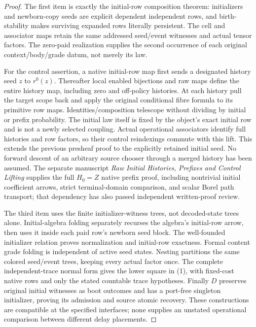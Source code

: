 \documentclass[11pt]{article}
\begin{document}
\begin{proof}
The first item is exactly the initial-row composition theorem: initializers
and newborn-copy seeds are explicit dependent independent rows, and
birth-stability makes surviving expanded rows literally persistent.
The cell and associator maps retain the same addressed seed/event witnesses
and actual tensor factors. The zero-paid realization supplies the second
occurrence of each original context/body/grade datum, not merely its law.

For the control assertion, a native initial-row map first sends a designated
history seed $z$ to $r^0(z)$. Thereafter local enabled bijections and raw maps
define the entire history map, including zero and off-policy histories.
At each history pull the target scope back and apply the original conditional
fibre formula to its primitive row maps. Identities/composition telescope
without dividing by initial or prefix probability. The initial law itself
is fixed by the object's exact initial row and is not a newly selected
coupling. Actual operational associators identify full histories and row
factors, so their control reindexings commute with this lift. This extends
the previous presheaf proof to the explicitly retained initial seed.
No forward descent of an arbitrary source chooser through a merged history
has been assumed. The separate manuscript \emph{Raw Initial Histories, Prefixes and Control Lifting} supplies the full $H_0=Z$ native prefix proof, including nontrivial initial coefficient arrows, strict terminal-domain comparison, and scalar Borel path transport; that dependency has also passed independent written-proof review.

The third item uses the finite initializer-witness trees, not decoded-state
trees alone. Initial-algebra folding separately recurses the algebra's
initial-row arrow, then uses it inside each paid row's newborn seed block.
The well-founded initializer relation proves normalization and initial-row
exactness. Formal content grade folding is independent of active seed states.
Nesting partitions the same colored seed/event trees, keeping every actual
factor once. The complete independent-trace normal form gives the lower
square in (1), with fixed-cost native rows and only the stated countable
trace hypotheses. Finally $D$ preserves original initial witnesses as boot
outcomes and has a port-free singleton initializer, proving its admission
and source atomic recovery. These constructions are compatible at the
specified interfaces; none supplies an unstated operational comparison
between different delay placements.
\end{proof}
\end{document}
